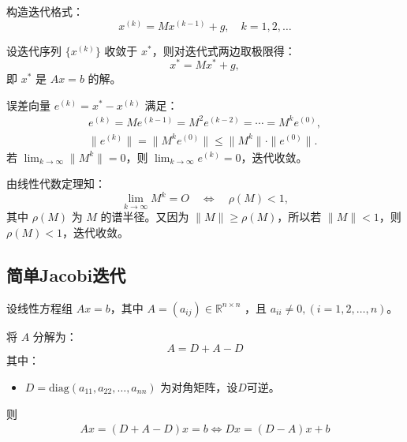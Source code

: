 构造迭代格式：
\[
x^{(k)} = Mx^{(k-1)} + g, \quad k = 1, 2, \dots
\]

设迭代序列 $\{x^{(k)}\}$ 收敛于 $x^*$，则对迭代式两边取极限得：
\[
x^* = Mx^* + g,
\]
即 $x^*$ 是 $Ax = b$ 的解。

误差向量 $e^{(k)} = x^* - x^{(k)}$ 满足：
\begin{gather*}
e^{(k)} = M e^{(k-1)} = M^2 e^{(k-2)} = \cdots = M^k e^{(0)}, \\
\|e^{(k)}\| = \|M^k e^{(0)}\| \leq \|M^k\| \cdot \|e^{(0)}\|.
\end{gather*}
若 $\lim_{k \to \infty} \|M^k\| = 0$，则 $\lim_{k \to \infty} e^{(k)} = 0$，迭代收敛。

由线性代数定理知：
\[
\lim_{k \to \infty} M^k = O \quad \Leftrightarrow \quad \rho(M) < 1,
\]
其中 $\rho(M)$ 为 $M$ 的谱半径。又因为 $\|M\| \geq \rho(M)$，所以若 $\|M\| < 1$，则 $\rho(M) < 1$，迭代收敛。
\subsection{简单Jacobi迭代}

设线性方程组 $Ax = b$，其中 $A = (a_{ij}) \in \mathbb{R}^{n \times n}$ ，且 $a_{ii} \neq 0, (i = 1, 2, \dots, n)$。

将 $A$ 分解为：
\[
A = D + A - D
\]
其中：
\begin{itemize}
    \item $D = \text{diag}(a_{11}, a_{22}, \dots, a_{nn})$ 为对角矩阵，设\(D\)可逆。
\end{itemize}

则\begin{gather*}
    Ax = (D + A - D)x = b \Leftrightarrow Dx = (D - A)x + b 
\end{gather*}

